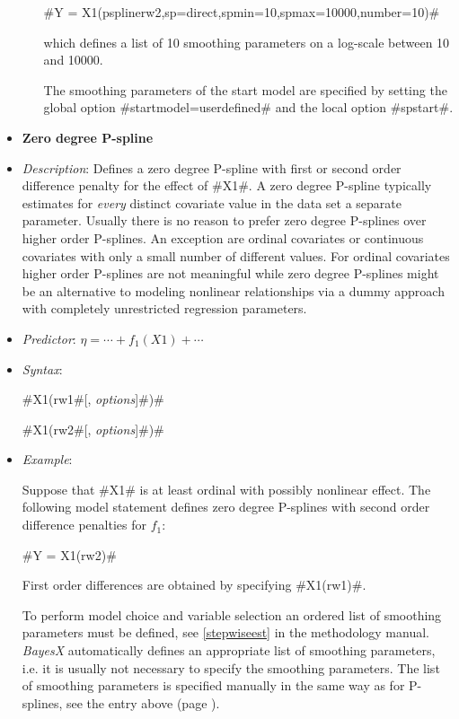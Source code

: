 \begin{itemize}
\begin{itemize}
#Y = X1(psplinerw2,sp=direct,spmin=10,spmax=10000,number=10)#

which defines a list of 10 smoothing parameters on a log-scale between 10 and 10000.

The smoothing parameters of the start model are specified by setting the global option #startmodel=userdefined# and the local option #spstart#.





\end{itemize}
\item[]{\bf\sffamily Zero degree P-spline }

\item[] {\em Description}: Defines a zero degree P-spline with first or second order difference penalty for the effect of #X1#.
A zero degree P-spline typically estimates for {\em every} distinct covariate value in the data set a separate parameter. Usually there
is no reason to prefer zero degree P-splines over higher order P-splines. An exception are ordinal covariates or continuous
covariates with only a small number of
different values. For ordinal covariates higher order P-splines are not meaningful while zero degree P-splines might be an alternative to
modeling nonlinear relationships via a dummy approach with completely unrestricted regression parameters.
\item[] {\em Predictor}: $\eta = \cdots + f_1(X1) + \cdots $
\item[] {\em Syntax}:

#X1(rw1#[, {\em options}]#)#

#X1(rw2#[, {\em options}]#)#
\item[] {\em Example}:

Suppose that #X1# is at least ordinal with possibly
nonlinear effect. The following model statement defines zero degree P-splines with second order difference penalties for $f_1$:

#Y = X1(rw2)#

First order differences are obtained by
specifying #X1(rw1)#.

To perform model choice and variable selection an ordered list of smoothing parameters must be defined, see
\autoref{stepwiseest} in the methodology manual. {\em BayesX} automatically defines an appropriate list of smoothing
parameters, i.e. it is usually not necessary to  specify the smoothing parameters. The list of smoothing parameters is
specified manually in the same way as for P-splines, see the entry above (page \pageref{psplines_stepwise}).


\end{itemize}
